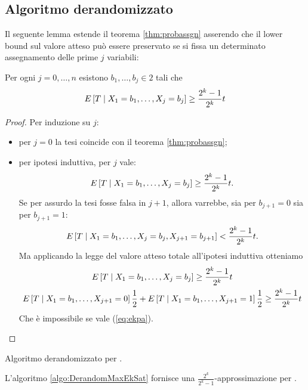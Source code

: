 \subsection{Algoritmo derandomizzato}
Il seguente lemma estende il teorema \ref{thm:probassgn} asserendo che il lower bound sul valore atteso può essere preservato se si fissa un determinato assegnamento delle prime $j$ variabili:
\begin{theorem}\label{thm:maxsatderandomexv}
	Per ogni $j=0,\dots,n$ esistono $b_1,\dots,b_j\in2$ tali che
	\begin{equation*}
		E\left[T\mid X_1=b_1,\dots,X_j=b_j\right] \geq \frac{2^k-1}{2^k}t
	\end{equation*}
\end{theorem}
\begin{proof}
	Per induzione su $j$:
	\begin{itemize}
		\item per $j=0$ la tesi coincide con il teorema \ref{thm:probassgn};
		\item per ipotesi induttiva, per $j$ vale:
		      \begin{equation*}
			      E\left[T\mid X_1=b_1,\dots,X_j=b_j\right]\geq\frac{2^k-1}{2^k}t \text.
		      \end{equation*}
		      Se per assurdo la tesi fosse falsa in $j+1$, allora varrebbe, sia per $b_{j+1}=0$ sia per $b_{j+1}=1$:
		      \begin{equation}\label{eq:ekpa}
			      E\left[T\mid X_1=b_1,\dots,X_j=b_j,X_{j+1}=b_{j+1}\right]<\frac{2^k-1}{2^k}t \text.
		      \end{equation}
		      Ma applicando la legge del valore atteso totale all'ipotesi induttiva otteniamo
		      \begin{gather*}
			      E\left[T\mid X_1=b_1,\dots,X_j=b_j\right] \geq \frac{2^k-1}{2^k}t \\
			      E\left[T\mid X_1=b_1,\dots,X_{j+1}=0\right]\frac12 + E\left[T\mid X_1=b_1,\dots,X_{j+1}=1\right]\frac12 \geq \frac{2^k-1}{2^k}t
		      \end{gather*}
		      Che è impossibile se vale (\ref{eq:ekpa}).
	\end{itemize}
\end{proof}

\begin{algorithm}[h]
	\caption{Algoritmo derandomizzato per \MaxEkSat.}
	\label{algo:DerandomMaxEkSat}
	
\end{algorithm}

\begin{theorem}
	L'algoritmo \ref{algo:DerandomMaxEkSat} fornisce una $\frac{2^k}{2^k -1}$-approssimazione per \MaxEkSat.
\end{theorem}

